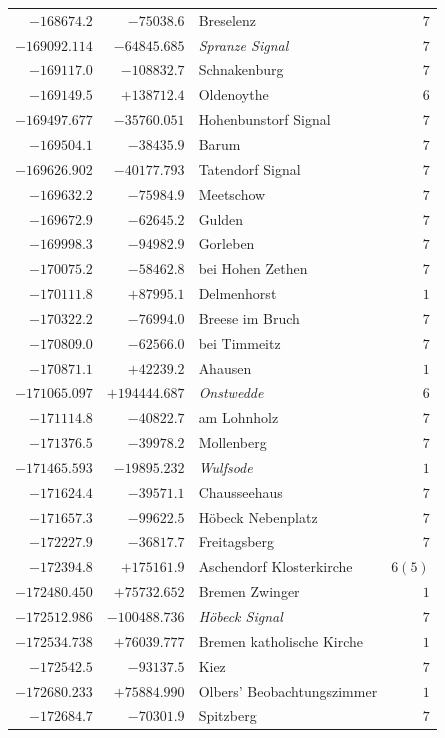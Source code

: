 \begin{center}
\begin{tabular}{r|r|p{170pt}|r}
\(-168674.2\)&\(-75038.6\)&Breselenz&\(7\)\\
\(-169092.114\)&\(-64845.685\)&\textit{Spranze Signal}&\(7\)\\
\(-169117.0\)&\(-108832.7\)&Schnakenburg&\(7\)\\
\(-169149.5\)&\(+138712.4\)&Oldenoythe&\(6\)\\
\(-169497.677\)&\(-35760.051\)&Hohenbunstorf Signal&\(7\)\\
\(-169504.1\)&\(-38435.9\)&Barum&\(7\)\\
\(-169626.902\)&\(-40177.793\)&Tatendorf Signal&\(7\)\\
\(-169632.2\)&\(-75984.9\)&Meetschow&\(7\)\\
\(-169672.9\)&\(-62645.2\)&Gulden&\(7\)\\
\(-169998.3\)&\(-94982.9\)&Gorleben&\(7\)\\
\(-170075.2\)&\(-58462.8\)&bei Hohen Zethen&\(7\)\\
\(-170111.8\)&\(+87995.1\)&Delmenhorst&\(1\)\\
\(-170322.2\)&\(-76994.0\)&Breese im Bruch&\(7\)\\
\(-170809.0\)&\(-62566.0\)&bei Timmeitz&\(7\)\\
\(-170871.1\)&\(+42239.2\)&Ahausen&\(1\)\\
\(-171065.097\)&\(+194444.687\)&\textit{Onstwedde}&\(6\)\\
\(-171114.8\)&\(-40822.7\)&am Lohnholz&\(7\)\\
\(-171376.5\)&\(-39978.2\)&Mollenberg&\(7\)\\
\(-171465.593\)&\(-19895.232\)&\textit{Wulfsode}&\(1\)\\
\(-171624.4\)&\(-39571.1\)&Chausseehaus&\(7\)\\
\(-171657.3\)&\(-99622.5\)&Höbeck Nebenplatz&\(7\)\\
\(-172227.9\)&\(-36817.7\)&Freitagsberg&\(7\)\\
\(-172394.8\)&\(+175161.9\)&Aschendorf Klosterkirche&\(6 (5)\)\\
\(-172480.450\)&\(+75732.652\)&Bremen Zwinger&\(1\)\\
\(-172512.986\)&\(-100488.736\)&\textit{Höbeck Signal}&\(7\)\\
\(-172534.738\)&\(+76039.777\)&Bremen katholische Kirche&\(1\)\\
\(-172542.5\)&\(-93137.5\)&Kiez&\(7\)\\
\(-172680.233\)&\(+75884.990\)&Olbers’ Beobachtungszimmer&\(1\)\\
\(-172684.7\)&\(-70301.9\)&Spitzberg&\(7\)\\
\hline\end{tabular}\endgroup\end{center}
